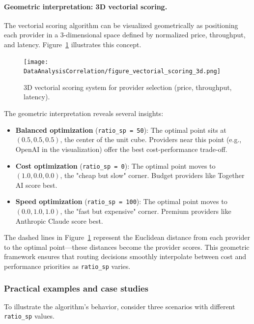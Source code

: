 \documentclass[english]{article}
\begin{document}
\paragraph{Geometric interpretation: 3D vectorial scoring.}

The vectorial scoring algorithm can be visualized geometrically as positioning each provider in a 3-dimensional space defined by normalized price, throughput, and latency. Figure~\ref{fig:vectorial_scoring_3d} illustrates this concept.

\begin{figure}[H]
\centering
\texttt{[image: DataAnalysisCorrelation/figure\_vectorial\_scoring\_3d.png]}
\caption{3D vectorial scoring system for provider selection (price, throughput, latency).}
\label{fig:vectorial_scoring_3d}
\end{figure}

The geometric interpretation reveals several insights:
\begin{itemize}
    \item \textbf{Balanced optimization} (\texttt{ratio\_sp = 50}): The optimal point sits at $(0.5, 0.5, 0.5)$, the center of the unit cube. Providers near this point (e.g., OpenAI in the visualization) offer the best cost-performance trade-off.
    \item \textbf{Cost optimization} (\texttt{ratio\_sp = 0}): The optimal point moves to $(1.0, 0.0, 0.0)$, the "cheap but slow" corner. Budget providers like Together AI score best.
    \item \textbf{Speed optimization} (\texttt{ratio\_sp = 100}): The optimal point moves to $(0.0, 1.0, 1.0)$, the "fast but expensive" corner. Premium providers like Anthropic Claude score best.
\end{itemize}

The dashed lines in Figure~\ref{fig:vectorial_scoring_3d} represent the Euclidean distance from each provider to the optimal point—these distances become the provider scores. This geometric framework ensures that routing decisions smoothly interpolate between cost and performance priorities as \texttt{ratio\_sp} varies.

\subsubsection{Practical examples and case studies}

To illustrate the algorithm's behavior, consider three scenarios with different \texttt{ratio\_sp} values.
\end{document}
